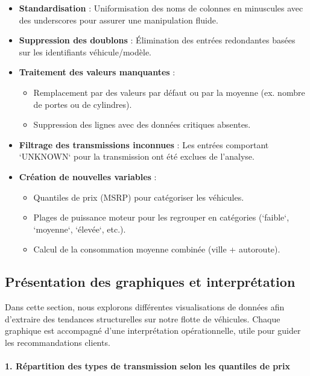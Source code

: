 \documentclass[12pt]{report}
\begin{document}
\begin{itemize}
  \item \textbf{Standardisation} : Uniformisation des noms de colonnes en minuscules avec des underscores pour assurer une manipulation fluide.
  \item \textbf{Suppression des doublons} : Élimination des entrées redondantes basées sur les identifiants véhicule/modèle.
  \item \textbf{Traitement des valeurs manquantes} :
    \begin{itemize}
        \item Remplacement par des valeurs par défaut ou par la moyenne (ex. nombre de portes ou de cylindres).
        \item Suppression des lignes avec des données critiques absentes.
    \end{itemize}
  \item \textbf{Filtrage des transmissions inconnues} : Les entrées comportant `UNKNOWN` pour la transmission ont été exclues de l’analyse.
  \item \textbf{Création de nouvelles variables} :
    \begin{itemize}
        \item Quantiles de prix (MSRP) pour catégoriser les véhicules.
        \item Plages de puissance moteur pour les regrouper en catégories (`faible`, `moyenne`, `élevée`, etc.).
        \item Calcul de la consommation moyenne combinée (ville + autoroute).
    \end{itemize}
\end{itemize}

\subsection{Présentation des graphiques et interprétation}

Dans cette section, nous explorons différentes visualisations de données afin d’extraire des tendances structurelles sur notre flotte de véhicules. Chaque graphique est accompagné d’une interprétation opérationnelle, utile pour guider les recommandations clients.

\paragraph{1. Répartition des types de transmission selon les quantiles de prix}\mbox{}
\end{document}
